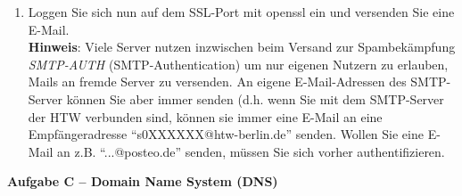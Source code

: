 \documentclass[paper=a4,fontsize=11pt]{scrartcl}%
\numberwithin{equation}{section}
\begin{document}
\begin{enumerate}
 	\item Loggen Sie sich nun auf dem SSL-Port mit openssl ein und versenden Sie eine E-Mail.\\
 	\textbf{Hinweis}: Viele Server nutzen inzwischen beim Versand zur Spambekämpfung \emph{SMTP-AUTH} (SMTP-Authentication) um nur eigenen Nutzern zu erlauben, Mails an fremde Server zu versenden. An eigene E-Mail-Adressen des SMTP-Server können Sie aber immer senden (d.h. wenn Sie mit dem SMTP-Server der HTW verbunden sind, können sie immer eine E-Mail an eine Empfängeradresse \enquote{s0XXXXXX@htw-berlin.de} senden. Wollen Sie eine E-Mail an z.B. \enquote{...@posteo.de} senden, müssen Sie sich vorher authentifizieren.
\end{enumerate}

\begin{center}\Large{\textbf{Aufgabe C -- Domain Name System (DNS)}}\end{center}\vskip0.25in
\end{document}
